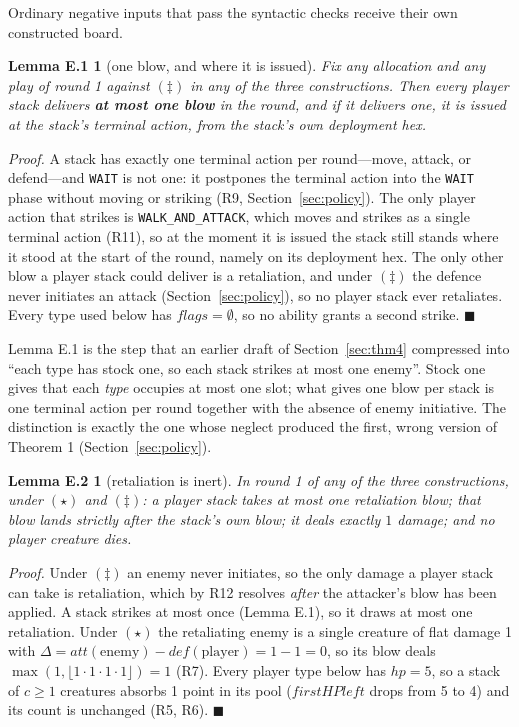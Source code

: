 \documentclass[11pt,a4paper]{article}
\theoremstyle{plain}
\newtheorem*{lemEblow}{Lemma E.1}
\newtheorem*{lemEretal}{Lemma E.2}
\theoremstyle{definition}
\theoremstyle{plain}
\theoremstyle{definition}
\theoremstyle{remark}
\newcommand{\qedbox}{\hfill$\blacksquare$}
\begin{document}
\noindent Ordinary negative inputs that pass the syntactic checks receive their own constructed board.

\begin{lemEblow}[one blow, and where it is issued]
Fix any allocation and any play of round 1 against $(\ddagger)$ in any of the three
constructions. Then every player stack delivers \textbf{at most one blow} in the round, and
if it delivers one, it is issued at the stack's terminal action, from the stack's own
deployment hex.
\end{lemEblow}

\noindent\emph{Proof.} A stack has exactly one terminal action per round---move, attack, or
defend---and \texttt{WAIT} is not one: it postpones the terminal action into the
\texttt{WAIT} phase without moving or striking (R9, Section~\ref{sec:policy}). The only
player action that strikes is \texttt{WALK\_AND\_ATTACK}, which moves and strikes as a
single terminal action (R11), so at the moment it is issued the stack still stands where it
stood at the start of the round, namely on its deployment hex. The only other blow a player
stack could deliver is a retaliation, and under $(\ddagger)$ the defence never initiates an
attack (Section~\ref{sec:policy}), so no player stack ever retaliates. Every type used
below has $\mathit{flags}=\emptyset$, so no ability grants a second strike. \qedbox

\smallskip
Lemma E.1 is the step that an earlier draft of Section~\ref{sec:thm4} compressed into ``each type has
stock one, so each stack strikes at most one enemy''. Stock one gives that each \emph{type}
occupies at most one slot; what gives one blow per stack is one terminal action per round
together with the absence of enemy initiative. The distinction is exactly the one whose
neglect produced the first, wrong version of Theorem 1 (Section~\ref{sec:policy}).

\begin{lemEretal}[retaliation is inert]
In round 1 of any of the three constructions, under $(\star)$ and $(\ddagger)$: a player
stack takes at most one retaliation blow; that blow lands strictly after the stack's own
blow; it deals exactly $1$ damage; and no player creature dies.
\end{lemEretal}

\noindent\emph{Proof.} Under $(\ddagger)$ an enemy never initiates, so the only damage a
player stack can take is retaliation, which by R12 resolves \emph{after} the attacker's
blow has been applied. A stack strikes at most once (Lemma E.1), so it draws at most one
retaliation. Under $(\star)$ the retaliating enemy is a single creature of flat damage 1
with $\Delta=\mathit{att}(\text{enemy})-\mathit{def}(\text{player})=1-1=0$, so its blow
deals $\max(1,\lfloor 1\cdot 1\cdot 1\cdot 1\rfloor)=1$ (R7). Every player type below has
$\mathit{hp}=5$, so a stack of $c\ge 1$ creatures absorbs 1 point in its pool
($\mathit{firstHPleft}$ drops from 5 to 4) and its $\mathrm{count}$ is unchanged (R5, R6).
\qedbox
\end{document}
